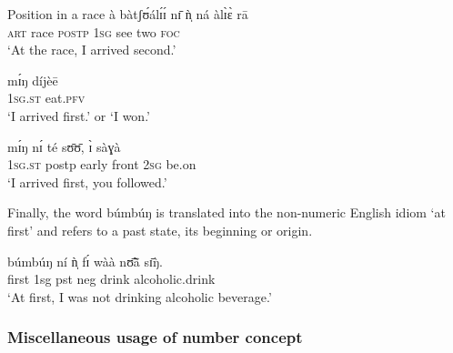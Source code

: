 \begin{exe}
\begin{exe}
\begin{exe}
\begin{exe}
\begin{exe}
\begin{exe}
\begin{exe}
\begin{exe}
\begin{exe}
\begin{exe}
\ea\label{ex:race}{\rm Position in a race}
\ea 
\gll à bàtʃʊ́álɪ́ɪ́ nɪ̄ ǹ̩ ná àlɪ̀ɛ̀  rā\\
 \textsc{art}  {race} \textsc{postp}   \textsc{1sg}  {see} {two}   \textsc{foc}
\\
 \glt  `At the race, I arrived second.'

\ex 
\gll mɪ́ŋ díjèē\\
 \textsc{1sg.st} {eat.\textsc{pfv}}\\
 \glt  `I arrived  first.' or `I won.'

\ex 
\gll mɪ́ŋ nɪ́ té sʊ̄ʊ̄, ɪ̀ sàɣà\\
 \textsc{1sg.st} {postp} {early} {front}  \textsc{2sg} {be.on}\\
 \glt  `I arrived  first, you followed.'
\z
\z

Finally, the word {\sls búmbúŋ} is translated into the non-numeric English idiom `at first' and refers to a past state, its beginning or origin.

\ea\label{ex:seqevent}
 \gll   búmbúŋ ní ǹ̩ fɪ́ wàà nʊ̃̄ã̄ sɪ̄ŋ̀.\\
first {\postp}  {\sc 1sg} {\sc pst} {\sc neg} drink alcoholic.drink\\
\glt  `At first, I was not drinking alcoholic beverage.'
\z


% 



\subsubsection{Miscellaneous usage of number concept} 
\label{sec:NUM-misc-usage}


\end{exe}
\end{exe}
\end{exe}
\end{exe}
\end{exe}
\end{exe}
\end{exe}
\end{exe}
\end{exe}
\end{exe}

